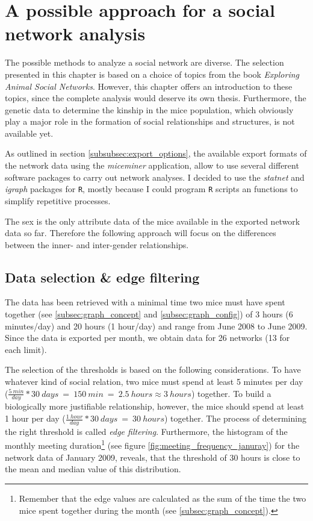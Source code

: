 \section{A possible approach for a social network analysis}
\label{sec:network_analysis}

The possible methods to analyze a social network are diverse. The selection presented in this chapter is based on a choice of topics from the book \textit{Exploring Animal Social Networks}\cite{croft:07}. However, this chapter offers an introduction to these topics, since the complete analysis would deserve its own thesis. Furthermore, the genetic data to determine the kinship in the mice population, which obviously play a major role in the formation of social relationships and structures, is not available yet.  

As outlined in section \ref{subsubsec:export_options}, the available export formats of the network data using the \textit{miceminer} application, allow to use several different software packages to carry out network analyses. I decided to use the \textit{statnet}\cite{statnet:03} and \textit{igraph}\cite{igraph:06} packages for \lstinline|R|\cite{r:05}, mostly because I could program \lstinline|R| scripts an functions to simplify repetitive processes.


The sex is the only attribute data of the mice available in the exported network data so far. Therefore the following approach will focus on the differences between the inner- and inter-gender relationships.

\subsection{Data selection \& edge filtering}
\label{subsec:data_selection}

The data has been retrieved with a minimal time two mice must have spent together (see \ref{subsec:graph_concept} and \ref{subsec:graph_config}) of 3 hours (6 minutes/day) and 20 hours (1 hour/day) and range from June 2008 to June 2009. Since the data is exported per month, we obtain data for 26 networks (13 for each limit).

The selection of the thresholds is based on the following considerations. To have whatever kind of social relation, two mice must spend at least 5 minutes per day ($\frac{5\:min}{day} * 30\:days\:=\:150\:min\:=\:2.5\:hours \approx 3\:hours$) together. To build a biologically more justifiable relationship, however, the mice should spend at least 1 hour per day ($\frac{1\:hour}{day} * 30\:days\:=\:30\:hours$) together. The process of determining the right threshold is called \textit{edge filtering}. Furthermore, the histogram of the monthly meeting duration\footnote{ Remember that the edge values are calculated as the sum of the time the two mice spent together during the month (see \ref{subsec:graph_concept}).} (see figure \ref{fig:meeting_frequency_januray}) for the network data of January 2009, reveals, that the threshold of 30 hours is close to the mean and median value of this distribution.

